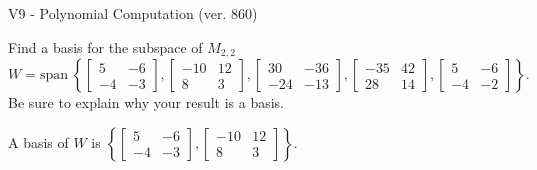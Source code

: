 \begin{exercise}
  \begin{exerciseTitle}V9 - Polynomial Computation (ver. 860)\end{exerciseTitle}
  \begin{exerciseStatement}
    Find a basis for the subspace of \(M_{2,2}\) 
\[W=\mathrm{span}\ \left\{\left[\begin{array}{cc}
5 & -6 \\
-4 & -3
\end{array}\right] , \left[\begin{array}{cc}
-10 & 12 \\
8 & 3
\end{array}\right] , \left[\begin{array}{cc}
30 & -36 \\
-24 & -13
\end{array}\right] , \left[\begin{array}{cc}
-35 & 42 \\
28 & 14
\end{array}\right] , \left[\begin{array}{cc}
5 & -6 \\
-4 & -2
\end{array}\right]\right\}.\]
 Be sure to explain why your result is a basis.


  \end{exerciseStatement}
  \begin{exerciseAnswer}
   A basis of \(W\) is  \(\left\{\left[\begin{array}{cc}
5 & -6 \\
-4 & -3
\end{array}\right] , \left[\begin{array}{cc}
-10 & 12 \\
8 & 3
\end{array}\right]\right\}\).
  


  \end{exerciseAnswer}
\end{exercise}